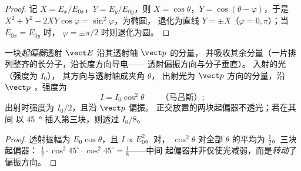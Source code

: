 \begin{proof}
记 $X = E_x/E_{0x}$，$Y = E_y/E_{0y}$，则 $X = \cos\theta$，$Y = \cos(\theta - \varphi)$，于是
$X^2 + Y^2 - 2XY\cos\varphi = \sin^2\varphi$，为椭圆，
退化为直线 $Y = \pm X$（$\varphi = 0, \pi$）；当 $E_{0x} = E_{0y}$ 时，
$\varphi = \pm\pi/2$ 时则退化为圆。
\end{proof}

\begin{proposition}[起偏器与马吕斯定律]\label{prop:b2:plane-waves-polarization:malus}
一块\emph{起偏器}透射 $\vect E$ 沿其透射轴 $\vect p$ 的分量，
并吸收其余分量（一片排列整齐的长分子，沿长度方向导电——
透射偏振方向与分子垂直）。
入射的光（强度为 $I_0$），
其方向与透射轴成夹角 $\theta$，
出射光为 $\vect p$ 方向的分量，沿 $\vect p$ ，强度为
\[
I = I_0\cos^2\theta \qquad\text{（马吕斯）} ;
\]
出射时强度为 $I_0/2$，且沿 $\vect p$ 偏振。
正交放置的两块起偏器不透光；若在其间
以 \qty{45}{\degree} 插入第三块，则透过 $I_0/8$。
\end{proposition}

\begin{proof}
透射振幅为 $E_0\cos\theta$，且 $I \propto E_0^2$。对，
$\cos^2\theta$ 对全部 $\theta$ 的平均为 $\tfrac12$。三块起偏器：
$\tfrac12\cdot\cos^2 45^\circ\cdot\cos^2 45^\circ = \tfrac18$——中间
起偏器并非仅使光减弱，而是\emph{转动}了偏振方向。
\end{proof}

